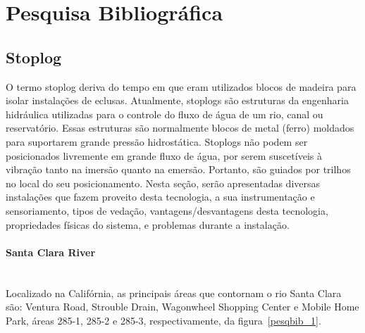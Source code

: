 

\section{Pesquisa Bibliográfica}
\label{pesqbib}
\subsection{Stoplog}
O termo stoplog deriva do tempo em que eram utilizados blocos de madeira para
isolar instalações de eclusas. Atualmente, stoplogs são estruturas da engenharia hidráulica utilizadas para o controle do fluxo de água de um rio, canal ou reservatório. Essas estruturas são normalmente blocos de metal (ferro) moldados para suportarem grande pressão hidrostática.
Stoplogs não podem ser posicionados livremente em grande fluxo de água, por serem suscetíveis à vibração tanto na imersão quanto na emersão. Portanto, são guiados por trilhos no local do seu posicionamento.
Nesta seção, serão apresentadas diversas instalações que fazem proveito desta tecnologia, a sua instrumentação e sensoriamento, tipos de vedação, vantagens/desvantagens desta tecnologia, propriedades físicas do sistema, e problemas durante a instalação.  

\paragraph{Santa Clara River}\mbox{}\\
Localizado na Califórnia, as principais áreas que contornam o rio Santa Clara
são: Ventura Road, Strouble Drain, Wagonwheel Shopping Center e Mobile Home
Park, áreas 285-1, 285-2 e 285-3, respectivamente, da figura~\ref{pesqbib_1}.


